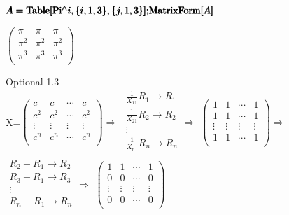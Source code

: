 \documentclass{article}
\begin{document}
\begin{doublespace}
\noindent\(\pmb{A=\text{Table}[\text{Pi}{}^{\wedge}i,\{i,1,3\},\{j,1,3\}];}\\
\pmb{\text{MatrixForm}[A]}\)
\end{doublespace}

\begin{doublespace}
\noindent\(\left(
\begin{array}{ccc}
 \pi  & \pi  & \pi  \\
 \pi ^2 & \pi ^2 & \pi ^2 \\
 \pi ^3 & \pi ^3 & \pi ^3 \\
\end{array}
\right)\)
\end{doublespace}

Optional 1.3\\
X=\(\left(
\begin{array}{cccc}
 c & c & \cdots  & c \\
 c^2 & c^2 & \cdots  & c^2 \\
 \vdots  & \vdots  & \vdots  & \vdots  \\
 c^n & c^n & \cdots  & c^n \\
\end{array}
\right)\Rightarrow\) \(\begin{array}{c}
 \frac{1}{X_{11}}R_1\rightarrow R_1 \\
 \frac{1}{X_{21}}R_2\rightarrow R_2 \\
 \vdots  \\
 \frac{1}{X_{\text{n1}}}R_n\rightarrow R_n \\
\end{array}
\Rightarrow\) \(\left(
\begin{array}{cccc}
 1 & 1 & \cdots  & 1 \\
 1 & 1 & \cdots  & 1 \\
 \vdots  & \vdots  & \vdots  & \vdots  \\
 1 & 1 & \cdots  & 1 \\
\end{array}
\right)\Rightarrow\) \(\begin{array}{c}
 R_2-R_1\rightarrow R_2 \\
 R_3-R_1\rightarrow R_3 \\
 \vdots  \\
 R_n-R_1\rightarrow R_n \\
\end{array}
\Rightarrow\) \(\left(
\begin{array}{cccc}
 1 & 1 & \cdots  & 1 \\
 0 & 0 & \cdots  & 0 \\
 \vdots  & \vdots  & \vdots  & \vdots  \\
 0 & 0 & \cdots  & 0 \\
\end{array}
\right)\)
\end{document}
